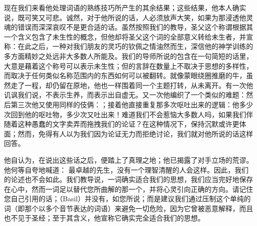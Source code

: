 现在我们来看他处理词语的熟练技巧所产生的其余结果；这些结果，他本人确实说，既可笑又可悲。诚然，对于他所说的话，人必须放声大笑，如果为那浸透他灵魂的错误而深深哀叹不是更合适的话。虽然按照我们的教导，圣父这个称谓根据其一个含义包含了未生性的概念，但他却将圣父这个词的全部意义转给未生者，并宣称：在此之后，一种对我们朋友的灵巧的钦佩之情油然而生，深信他的神学训练的多方面精妙之处远非大多数人所能及。我们的导师所说的包含在一句简短的话里，大意是藉着这个称号可以表示未生性；但的言辞在数量上不取决于思想的多样性，而取决于任何类似名称范围内的东西如何可以被翻转。就像蒙眼绕圈推磨的牛，虽然走了一程，却仍留在原地，他也一样围着同一个主题打转，从未离开。有一次他讥讽我们说，不表示生养，而表示出自虚无。又一次他编织了一个类似的难题：然后第三次他又使用同样的伎俩：；接着他直接重复那多次呕吐出来的逻辑：他多少次回到他的呕吐物，多少次又吐出来！难道我们不会惹恼大多数人吗，如果我们伴随着这种愚蠢的文字卖弄而拖拽我们的论证？在这种情况下，保持沉默或许更体面；然而，免得有人以为我们因为论证无力而拒绝讨论，我们就对他所说的话这样回答。\par

他自认为，在说出这些话之后，便踏上了真理之地；他已揭露了对手立场的荒谬。他何等自夸地喊道： 最卓越的先生，没有一个理智清醒的人会这样。因此，我们的论述也不会如此。我们教导说，一词确实适合我们的思想，我们应当完好地保存在心中，然而一词足以替代您所曲解的那一个，并将心灵引向正确的方向。请记住您自己引用的话；（Basil）并没有，如您所说；而是建议我们通过压制这个单纯的词（即那个以多个音节表达的词语）来避免一切危险，因为它曾被恶意解释，而且也不见于圣经；至于其含义，他宣称它确实完全适合我们的思想。\par

